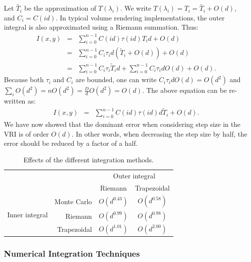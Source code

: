 Let $\tilde{T_i}$ be the approximation of $T(\lambda_i)$. We write
$T(\lambda_i) = T_i = \tilde{T_i} + O(d)$, and $C_i = C(id)$.  
%
In typical volume rendering implementations, the outer integral is
also approximated using a Riemann summation. Thus:
\begin{eqnarray}
I(x,y) &=& \sum_{i=0} ^ {n-1} C(i d) \tau(i d) T_i d + O(d)\\
&=& \sum_{i=0}^{n-1} C_i \tau_i d \left(\tilde{T}_{i} + O(d)\right) + O(d)\\
&=& \sum_{i=0}^{n-1} C_i \tau_i \tilde{T}_{i} d + \sum_{i=0}^{n-1} C_i \tau_i d O(d) + O(d).
\end{eqnarray}
Because both $\tau_i$ and $C_i$ are bounded, one can write $C_i \tau_i d O(d) = O(d^2)$ and $\sum_i O(d^2) = n O(d^2) = \frac{D}{d}O(d^2) = O(d)$. The above equation can be re-written as:
\begin{eqnarray}
I(x,y)  &=& \sum_{i=0} ^ {n-1} C(i d) \tau(i d) d \tilde{T}_{i} + O(d).
\end{eqnarray}
We have now showed that the dominant error when considering step size
in the VRI is of order $O(d)$. In other words, when decreasing the step size by half, the
error should be reduced by a factor of a half.


\begin{table}[b]
\normalsize
  \caption{Effects of the different integration methods.}
  \centering
  \begin{tabular}{c  r | c c }
  & & \multicolumn{2}{c}{Outer integral}\\
   &                & Riemann & Trapezoidal \\
    \hline
\multirow{3}{*}{\parbox{1cm}{Inner \mbox{integral}}} & Monte Carlo & $ O(d^{0.43}) $ & $ O(d^{0.58})$ \\
& Riemann      & $ O(d^{0.99}) $ & $ O(d^{0.98}) $ \\
&Trapezoidal     & $ O(d^{1.01}) $ & $ O(d^{2.00})$ \\
    \hline  
  \end{tabular} 
  \label{table:orders} 
\end{table}

\subsubsection{Numerical Integration Techniques}

